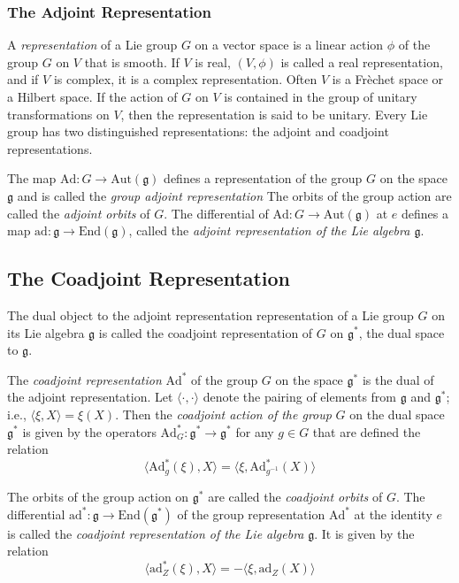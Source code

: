 \subsubsection{The Adjoint Representation}
\indent A \textit{representation} of a Lie group $G$ on a vector space is a linear action $\phi$ of the group $G$ on $V$ that is smooth. If $V$ is real, $(V, \phi)$ is called a real representation, and if $V$ is complex, it is a complex representation. Often $V$ is a Fr\`echet space or a Hilbert space. If the action of $G$ on $V$ is contained in the group of unitary transformations on $V$, then the representation is said to be unitary. 
\indent Every Lie group has two distinguished representations: the adjoint and coadjoint representations. \\


\begin{defn}

	The map $\mathrm{Ad}:G \to \mathrm{Aut}( \mathfrak{g})$ defines a representation of the group $G$ on the space $ \mathfrak{g}$ and is called the \textit{group adjoint representation} The orbits of the group action are called the \textit{adjoint orbits} of $G$. The differential of $ \mathrm{Ad}: G \to \mathrm{Aut}( \mathfrak{g})$ at $e$ defines a map $ \mathrm{ad}: \mathfrak{g} \to \mathrm{End}( \mathfrak{g})$, called the \textit{adjoint representation of the Lie algebra $ \mathfrak{g}$}.

\end{defn}

\subsection{The Coadjoint Representation}

\indent The dual object to the adjoint representation representation of a Lie group $G$ on its Lie algebra $ \mathfrak{g}$ is called the coadjoint representation of $G$ on $ \mathfrak{g}^*$, the dual space to $ \mathfrak{g}$. 


\begin{defn}

	The \textit{coadjoint representation} $\mathrm{Ad}^*$ of the group $G$ on the space $ \mathfrak{g}^*$ is the dual of the adjoint representation. Let $ \langle \cdot, \cdot \rangle$ denote the pairing of elements from $ \mathfrak{g}$ and $ \mathfrak{g}^*$; i.e., $ \langle \xi, X \rangle = \xi (X)$. Then the \textit{coadjoint action of the group} $G$ on the dual space $ \mathfrak{g}^*$ is given by the operators $ \mathrm{Ad}^*_G: \mathfrak{g}^* \to \mathfrak{g}^*$ for any $g \in G$ that are defined the relation
	\[\langle \mathrm{Ad}^*_g (\xi), X \rangle = \langle \xi, \mathrm{Ad}^*_{g^{-1}} (X) \rangle\]

The orbits of the group action on $ \mathfrak{g}^*$ are called the \textit{coadjoint orbits} of $G$.
\indent The differential $ \mathrm{ad}^*: \mathfrak{g} \to \mathrm{End}( \mathfrak{g}^* )$ of the group representation $ \mathrm{Ad}^*$ at the identity $e$ is called the \textit{coadjoint representation of the Lie algebra} $ \mathfrak{g}$. It is given by the relation
\[ \langle \mathrm{ad}^*_Z (\xi), X \rangle = - \langle \xi, \mathrm{ad}_Z (X) \rangle  \]
\end{defn}


